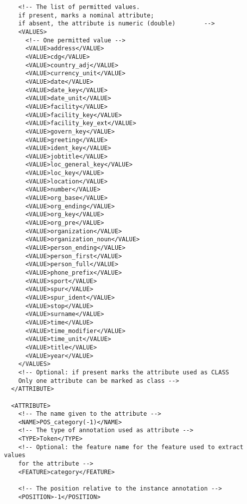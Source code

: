 \begin{verbatim}
    <!-- The list of permitted values.
    if present, marks a nominal attribute;
    if absent, the attribute is numeric (double)        -->
    <VALUES>
      <!-- One permitted value -->
      <VALUE>address</VALUE>
      <VALUE>cdg</VALUE>
      <VALUE>country_adj</VALUE>
      <VALUE>currency_unit</VALUE>
      <VALUE>date</VALUE>
      <VALUE>date_key</VALUE>
      <VALUE>date_unit</VALUE>
      <VALUE>facility</VALUE>
      <VALUE>facility_key</VALUE>
      <VALUE>facility_key_ext</VALUE>
      <VALUE>govern_key</VALUE>
      <VALUE>greeting</VALUE>
      <VALUE>ident_key</VALUE>
      <VALUE>jobtitle</VALUE>
      <VALUE>loc_general_key</VALUE>
      <VALUE>loc_key</VALUE>
      <VALUE>location</VALUE>
      <VALUE>number</VALUE>
      <VALUE>org_base</VALUE>
      <VALUE>org_ending</VALUE>
      <VALUE>org_key</VALUE>
      <VALUE>org_pre</VALUE>
      <VALUE>organization</VALUE>
      <VALUE>organization_noun</VALUE>
      <VALUE>person_ending</VALUE>
      <VALUE>person_first</VALUE>
      <VALUE>person_full</VALUE>
      <VALUE>phone_prefix</VALUE>
      <VALUE>sport</VALUE>
      <VALUE>spur</VALUE>
      <VALUE>spur_ident</VALUE>
      <VALUE>stop</VALUE>
      <VALUE>surname</VALUE>
      <VALUE>time</VALUE>
      <VALUE>time_modifier</VALUE>
      <VALUE>time_unit</VALUE>
      <VALUE>title</VALUE>
      <VALUE>year</VALUE>
    </VALUES>
    <!-- Optional: if present marks the attribute used as CLASS
    Only one attribute can be marked as class -->
  </ATTRIBUTE>

  <ATTRIBUTE>
    <!-- The name given to the attribute -->
    <NAME>POS_category(-1)</NAME>
    <!-- The type of annotation used as attribute -->
    <TYPE>Token</TYPE>
    <!-- Optional: the feature name for the feature used to extract values
    for the attribute -->
    <FEATURE>category</FEATURE>

    <!-- The position relative to the instance annotation -->
    <POSITION>-1</POSITION>


\end{verbatim}
